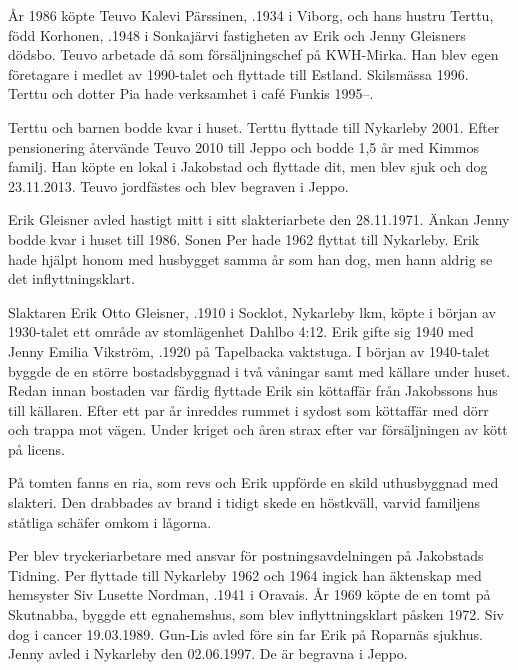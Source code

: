 År 1986 köpte Teuvo Kalevi Pärssinen, .1934 i Viborg, och hans hustru Terttu, född Korhonen, .1948 i Sonkajärvi fastigheten av Erik och Jenny Gleisners dödsbo. Teuvo arbetade då som	försäljningschef på KWH-Mirka. Han blev egen företagare i medlet av 1990-talet och flyttade till Estland. Skilsmässa 1996. Terttu och dotter Pia hade verksamhet i café Funkis 1995--.
\begin{jhchildren}
  \item {}
  \item {}
  \item {}
\end{jhchildren}
Terttu och barnen bodde kvar i huset. Terttu flyttade till Nykarleby 2001. Efter pensionering återvände Teuvo 2010 till Jeppo och bodde 1,5 år med Kimmos familj. Han köpte en lokal i Jakobstad och flyttade dit, men blev sjuk och dog 23.11.2013. Teuvo jordfästes och blev begraven i Jeppo.


Erik Gleisner avled hastigt mitt i sitt slakteriarbete den 28.11.1971. Änkan Jenny bodde kvar i huset till 1986. Sonen Per hade 1962 flyttat till Nykarleby. Erik hade hjälpt honom med husbygget samma år som han dog, men hann aldrig se det inflyttningsklart.


Slaktaren Erik Otto Gleisner, .1910 i Socklot, Nykarleby lkm, köpte i början av 1930-talet ett område av stomlägenhet Dahlbo 4:12. Erik gifte sig 1940 med Jenny Emilia Vikström, .1920	på Tapelbacka vaktstuga. I början av 1940-talet byggde de en större bostadsbyggnad i två våningar samt med källare under huset. Redan innan bostaden var färdig flyttade Erik sin köttaffär från Jakobssons hus till källaren. Efter ett par år inreddes rummet i sydost som köttaffär med dörr och trappa mot vägen. Under kriget och åren strax efter var försäljningen av kött på licens.

På tomten fanns en ria, som revs och Erik uppförde en skild uthusbyggnad med slakteri. Den drabbades av brand i tidigt skede en höstkväll, varvid familjens ståtliga schäfer omkom i lågorna.
\begin{jhchildren}
  \item {}
  \item {}
\end{jhchildren}
Per blev tryckeriarbetare med ansvar för postningsavdelningen på 	Jakobstads Tidning. Per flyttade till Nykarleby 1962 och 1964 ingick	han äktenskap med hemsyster Siv Lusette Nordman, .1941	i Oravais. År 1969 köpte de en tomt på Skutnabba, byggde ett egnahemshus, som blev inflyttningsklart påsken 1972. Siv dog i cancer 19.03.1989. Gun-Lis avled före sin far Erik på Roparnäs sjukhus. Jenny avled i Nykarleby den 02.06.1997. De är begravna i Jeppo.


